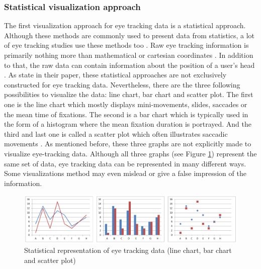 \subsubsection{Statistical visualization approach}
The first visualization approach for eye tracking data is a statistical approach. Although these methods are commonly used to present data from statistics, a lot of eye tracking studies use these methods too \autocite{blascheck2014state}. Raw eye tracking information is primarily nothing more than mathematical or cartesian coordinates \autocite{blascheck2014state, biedert2010eyebook}. In addition to that, the raw data can contain information about the position of a user's head \autocite[]{biedert2010eyebook}. 
As \textcite[]{blascheck2014state} state in their paper, these statistical approaches are not exclusively constructed for eye tracking data. Nevertheless, there are the three following possibilities to visualize the data: line chart, bar chart and scatter plot. The first one is the line chart which mostly displays mini-movements, slides, saccades or the mean time of fixations. The second is a bar chart which is typically used in the form of a histogram where the mean fixation duration is portrayed. And the third and last one is called a scatter plot which often illustrates saccadic movements \autocite[]{blascheck2014state}.
As mentioned before, these three graphs are not explicitly made to visualize eye-tracking data. Although all three graphs (see Figure \ref{figure:Statistics}) represent the same set of data, eye tracking data can be represented in many different ways. Some visualizations method may even mislead or give a false impression of the information.

\begin{figure}[!ht]
    \centering
    \includegraphics[width=1\linewidth]{images/statistics_blascheck2014state.png}
    \caption{
       Statistical representation of eye tracking data (line chart, bar chart and scatter plot) \autocite[7]{blascheck2014state}
    }
    \label{figure:Statistics}
\end{figure}

